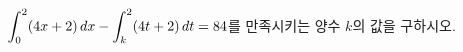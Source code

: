 $\displaystyle\int_{0}^{2} (4x+2)\mkern3mu dx-\int_{k}^{2} (4t+2)\mkern3mu dt=84$를 만족시키는 양수 $k$의 값을 구하시오.
